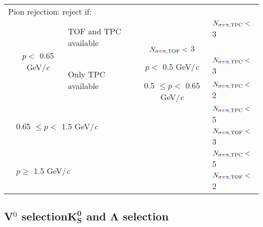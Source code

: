 \documentclass[ALICE,manyauthors]{cernphprep}
\newcommand{\Kpm}{$\mathrm{K^{\pm}}$\xspace}
\newcommand{\Vz}{V$^{0}$\xspace}
\begin{document}
\begin{table}[htbp]
\begin{tabular}{lcc|c|l}
   \multicolumn{5}{l}{Pion rejection:  reject if:} \\
   \cline{2-5}
   \multirow{4}{*}{} & \multirow{4}{*}{$p <$ 0.65 GeV/\textit{c}} & \multicolumn{1}{l}{\multirow{2}{*}{TOF and TPC available}} & \multicolumn{1}{c|}{} & $N_{\sigma {\color{red}\pi} {\color{blue}\uppi},\mathrm{TPC}} <$ 3 \\
   \multicolumn{4}{c|}{} & $N_{\sigma {\color{red}\pi} {\color{blue}\uppi},\mathrm{TOF}} <$ 3 \\
   \cline{3-5}
   \multicolumn{2}{c}{} & \multicolumn{1}{l|}{\multirow{2}{*}{Only TPC available}} & $p <$ 0.5 GeV/\textit{c} & $N_{\sigma {\color{red}\pi} {\color{blue}\uppi},\mathrm{TPC}} <$ 3 \\
   \cline{4-5}
   \multicolumn{3}{c|}{} & 0.5 $\leq p <$ 0.65 GeV/\textit{c} & $N_{\sigma {\color{red}\pi} {\color{blue}\uppi},\mathrm{TPC}} <$ 2 \\
   \cline{2-5}
    & \multicolumn{3}{l|}{\multirow{2}{*}{0.65 $\leq p <$ 1.5 GeV/\textit{c}}} & $N_{\sigma {\color{red}\pi} {\color{blue}\uppi},\mathrm{TPC}} <$ 5 \\
    \multicolumn{4}{c|}{} & $N_{\sigma {\color{red}\pi} {\color{blue}\uppi},\mathrm{TOF}} <$ 3 \\
   \cline{2-5}
    & \multicolumn{3}{l|}{\multirow{2}{*}{$p \geq$ 1.5 GeV/\textit{c}}} & $N_{\sigma {\color{red}\pi} {\color{blue}\uppi},\mathrm{TPC}} <$ 5 \\
    \multicolumn{4}{c|}{} & $N_{\sigma {\color{red}\pi} {\color{blue}\uppi},\mathrm{TOF}} <$ 2 \\
   \hline
  \end{tabular}
 \label{tab:KchCuts} 
\end{table}


\subsection{{\color{red}\Vz selection}{\color{blue}$\mathbf{K^{0}_{S}}$ and $\boldsymbol{\Lambda}$ selection}}
\label{sec:V0Selection}
\end{document}
